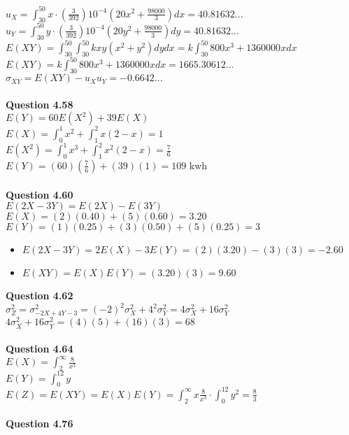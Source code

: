 \documentclass{article}
\begin{document}
        $u_X = \int_{30}^{50}x\cdot (\frac{3}{392})10^{-4}(20x^2+\frac{98000}{3})dx = 40.81632...$\\
        $u_Y = \int_{30}^{50}y\cdot (\frac{3}{392})10^{-4}(20y^2+\frac{98000}{3})dy = 40.81632...$\\
        $E(XY) = \int_{30}^{50}\int_{30}^{50}kxy(x^2+y^2)dydx = k\int_{30}^{50}800x^3+1360000xdx$\\
        $E(XY) = k\int_{30}^{50}800x^3+1360000xdx = 1665.30612...$\\
        $\sigma_{XY} = E(XY) - u_Xu_Y = -0.6642...$
        \\\\
    \textbf{Question 4.58}\\
        $E(Y) = 60E(X^2) + 39E(X)$\\
        $E(X) = \int_0^1x^2 + \int_1^2x(2-x) = 1$\\
        $E(X^2) = \int_0^1x^3 + \int_1^2x^2(2-x) = \frac{7}{6}$\\
        $E(Y) = (60)(\frac{7}{6}) + (39)(1) = 109$ kwh
        \\\\
    \textbf{Question 4.60}\\
        $E(2X-3Y) = E(2X) - E(3Y)$\\
        $E(X) = (2)(0.40) + (5)(0.60) = 3.20$\\
        $E(Y) = (1)(0.25) + (3)(0.50) + (5)(0.25) = 3$
        \begin{itemize}
            \item $E(2X-3Y) = 2E(X) - 3E(Y) = (2)(3.20)-(3)(3) = -2.60$
            \item $E(XY) = E(X)E(Y) = (3.20)(3) = 9.60$
        \end{itemize}
    \textbf{Question 4.62}\\
        $\sigma_Z^2 = \sigma_{-2X+4Y-3}^2 = (-2)^2\sigma_X^2 + 4^2\sigma_Y^2 = 4\sigma_X^2 + 16\sigma_Y^2$\\
        $4\sigma_X^2 + 16\sigma_Y^2 = (4)(5) + (16)(3) = 68$
    \\\\
    \textbf{Question 4.64}\\
        $E(X) = \int_2^{\infty}\frac{8}{x^3}$\\
        $E(Y) = \int_0^12y$\\
        $E(Z) = E(XY) = E(X)E(Y) = \int_2^{\infty}x\frac{8}{x^3} \cdot \int_0^12y^2 = \frac{8}{3}$
        \\\\
    \textbf{Question 4.76}\\
\end{document}
